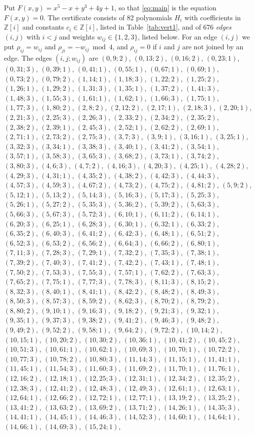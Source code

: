 \documentclass[11pt]{article}
\newcommand{\Z}{\mathbb{Z}}
\begin{document}
Put $F(x,y)=x^{5}-x+y^{3}+4y+1$, so that \eqref{eq:main} is the equation $F(x,y)=0$. The certificate consists of 82 polynomials $H_i$ with coefficients in $\Z[i]$ and constants $c_i\in\Z[i]$, listed in Table~\ref{tab:vert1}, and of 676 \emph{edges} $(i,j)$ with $i<j$ and weights $w_{ij}\in\{1,2,3\}$, listed below. For an edge $(i,j)$ we put $\rho_{ij}=w_{ij}$ and $\rho_{ji}=-w_{ij}\bmod 4$, and $\rho_{ij}=0$ if $i$ and $j$ are not joined by an edge.
The edges $(i,j;w_{ij})$ are $(0,9;2)$, $(0,13;2)$, $(0,16;2)$, $(0,23;1)$, $(0,31;3)$, $(0,39;1)$, $(0,41;1)$, $(0,55;1)$, $(0,67;1)$, $(0,69;1)$, $(0,73;2)$, $(0,79;2)$, $(1,14;1)$, $(1,18;3)$, $(1,22;2)$, $(1,25;2)$, $(1,26;1)$, $(1,29;2)$, $(1,31;3)$, $(1,35;1)$, $(1,37;2)$, $(1,41;3)$, $(1,48;3)$, $(1,55;3)$, $(1,61;1)$, $(1,62;1)$, $(1,66;3)$, $(1,75;1)$, $(1,77;3)$, $(1,80;2)$, $(2,8;2)$, $(2,12;2)$, $(2,17;1)$, $(2,18;3)$, $(2,20;1)$, $(2,21;3)$, $(2,25;3)$, $(2,26;3)$, $(2,33;2)$, $(2,34;2)$, $(2,35;2)$, $(2,38;2)$, $(2,39;1)$, $(2,45;3)$, $(2,52;1)$, $(2,62;2)$, $(2,69;1)$, $(2,71;1)$, $(2,73;2)$, $(2,75;3)$, $(3,7;3)$, $(3,9;1)$, $(3,16;1)$, $(3,25;1)$, $(3,32;3)$, $(3,34;1)$, $(3,38;3)$, $(3,40;1)$, $(3,41;2)$, $(3,54;1)$, $(3,57;1)$, $(3,58;3)$, $(3,65;3)$, $(3,68;2)$, $(3,73;1)$, $(3,74;2)$, $(3,80;3)$, $(4,6;3)$, $(4,7;2)$, $(4,16;3)$, $(4,20;3)$, $(4,25;1)$, $(4,28;2)$, $(4,29;3)$, $(4,31;1)$, $(4,35;2)$, $(4,38;2)$, $(4,42;3)$, $(4,44;3)$, $(4,57;3)$, $(4,59;3)$, $(4,67;2)$, $(4,73;2)$, $(4,75;2)$, $(4,81;2)$, $(5,9;2)$, $(5,12;1)$, $(5,13;2)$, $(5,14;3)$, $(5,16;3)$, $(5,17;3)$, $(5,25;3)$, $(5,26;1)$, $(5,27;2)$, $(5,35;3)$, $(5,36;2)$, $(5,39;2)$, $(5,63;3)$, $(5,66;3)$, $(5,67;3)$, $(5,72;3)$, $(6,10;1)$, $(6,11;2)$, $(6,14;1)$, $(6,20;3)$, $(6,25;1)$, $(6,28;3)$, $(6,30;1)$, $(6,32;1)$, $(6,33;2)$, $(6,35;2)$, $(6,40;3)$, $(6,41;2)$, $(6,42;3)$, $(6,48;1)$, $(6,51;2)$, $(6,52;3)$, $(6,53;2)$, $(6,56;2)$, $(6,64;3)$, $(6,66;2)$, $(6,80;1)$, $(7,11;3)$, $(7,28;3)$, $(7,29;1)$, $(7,32;2)$, $(7,35;3)$, $(7,38;1)$, $(7,39;2)$, $(7,40;3)$, $(7,41;2)$, $(7,42;2)$, $(7,43;1)$, $(7,48;1)$, $(7,50;2)$, $(7,53;3)$, $(7,55;3)$, $(7,57;1)$, $(7,62;2)$, $(7,63;3)$, $(7,65;2)$, $(7,75;1)$, $(7,77;3)$, $(7,78;3)$, $(8,11;3)$, $(8,15;2)$, $(8,32;3)$, $(8,40;1)$, $(8,41;1)$, $(8,42;2)$, $(8,48;2)$, $(8,49;3)$, $(8,50;3)$, $(8,57;3)$, $(8,59;2)$, $(8,62;3)$, $(8,70;2)$, $(8,79;2)$, $(8,80;2)$, $(9,10;1)$, $(9,16;3)$, $(9,18;2)$, $(9,21;3)$, $(9,32;1)$, $(9,35;1)$, $(9,37;3)$, $(9,38;2)$, $(9,41;2)$, $(9,46;3)$, $(9,48;2)$, $(9,49;2)$, $(9,52;2)$, $(9,58;1)$, $(9,64;2)$, $(9,72;2)$, $(10,14;2)$, $(10,15;1)$, $(10,20;2)$, $(10,30;2)$, $(10,36;1)$, $(10,41;2)$, $(10,45;2)$, $(10,51;3)$, $(10,61;1)$, $(10,62;1)$, $(10,69;3)$, $(10,70;1)$, $(10,72;2)$, $(10,77;3)$, $(10,78;2)$, $(10,80;3)$, $(11,14;3)$, $(11,15;1)$, $(11,41;1)$, $(11,45;1)$, $(11,54;3)$, $(11,60;3)$, $(11,69;2)$, $(11,70;1)$, $(11,76;1)$, $(12,16;2)$, $(12,18;1)$, $(12,25;3)$, $(12,31;1)$, $(12,34;2)$, $(12,35;2)$, $(12,38;3)$, $(12,41;2)$, $(12,48;3)$, $(12,49;3)$, $(12,61;1)$, $(12,63;1)$, $(12,64;1)$, $(12,66;2)$, $(12,72;1)$, $(12,77;1)$, $(13,19;2)$, $(13,25;2)$, $(13,41;2)$, $(13,63;2)$, $(13,69;2)$, $(13,71;2)$, $(14,26;1)$, $(14,35;3)$, $(14,41;1)$, $(14,45;1)$, $(14,46;3)$, $(14,52;3)$, $(14,60;1)$, $(14,64;1)$, $(14,66;1)$, $(14,69;3)$, $(15,24;1)$, 
\end{document}
